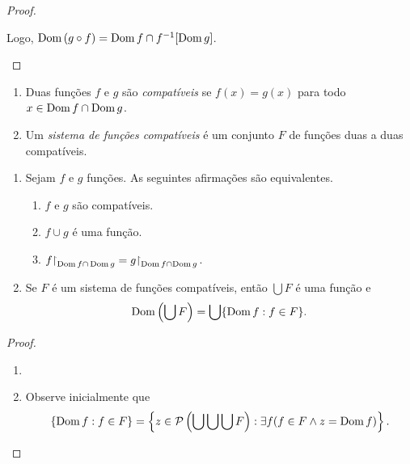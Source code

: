 \begin{proof}
\begin{enumerate}[leftmargin=*, align=left, label=\textbf{(\alph*)}]
\begin{itemize}
                \end{itemize}
            Logo, $\operatorname{Dom} \, (g \circ f) = \operatorname{Dom} f \cap f^{-1}[\operatorname{Dom} g]$. \blackproof
        \end{enumerate}
\end{proof}

\begin{definition}
    \leavevmode
        \begin{enumerate}[leftmargin=*, align=left, label=\textbf{(\alph*)}]
            \item Duas funções $f$ e $g$ são \emph{compatíveis} se $f(x) = g(x)$ para todo $x \in \operatorname{Dom} f \cap \operatorname{Dom} g$.
            \item Um \emph{sistema de funções compatíveis} é um conjunto $F$ de funções duas a duas compatíveis.
        \end{enumerate}
\end{definition}

\begin{proposition} 
    \leavevmode
        \begin{enumerate}[leftmargin=*, align=left, label=\textbf{(\alph*)}]
            \item Sejam $f$ e $g$ funções. As seguintes afirmações são equivalentes.
                \begin{enumerate}[label=\roman*.]
                    \item $f$ e $g$ são compatíveis.
                    \item $f \cup g$ é uma função.
                    \item $f \restriction_{\Dom f {\cap} \Dom g} = g \restriction_{\Dom f \cap \Dom g}$. 
                \end{enumerate}
            \item Se $F$ é um sistema de funções compatíveis, então $\bigcup F$ é uma função e
                \[
                    \operatorname{Dom}  \left( \bigcup F \right) = \bigcup \{\operatorname{Dom} f : f \in F \}.
                \]
        \end{enumerate}
\end{proposition}

\begin{proof}
    \leavevmode
        \begin{enumerate}[leftmargin=*, align=left, label=\textbf{(\alph*)}]
            \item 
            \item Observe inicialmente que
                \[
                    \{\operatorname{Dom} f : f \in F \} = \left\{z \in \mathcal{P}\left( \bigcup \bigcup \bigcup F \right) : \exists f (f \in F \land z = \operatorname{Dom} f) \right\}.
                \]
        \end{enumerate}
\end{proof}


